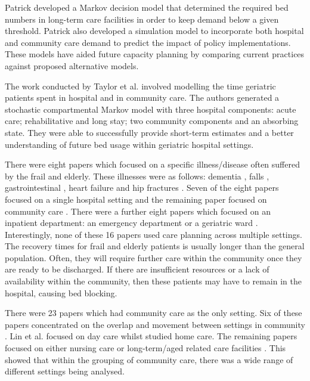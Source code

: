 \documentclass[../thesis.tex]{subfiles}
\begin{document}
Patrick \cite{Patrick} developed a Markov decision model that determined the required bed numbers in long-term care facilities in order to keep demand below a given threshold. Patrick also developed a simulation model to incorporate both hospital and community care demand to predict the impact of policy implementations. These models have aided future capacity planning by comparing current practices against proposed alternative models.

The work conducted by Taylor et al. \cite{Taylor} involved modelling the time geriatric patients spent in hospital and in community care. The authors generated a stochastic compartmental Markov model with three hospital components: acute care; rehabilitative and long stay; two community components and an absorbing state. They were able to successfully provide short-term estimates and a better understanding of future bed usage within geriatric hospital settings.

There were eight papers which focused on a specific illness/disease often suffered by the frail and elderly. These illnesses were as follows: dementia \cite{Cepoiu}, falls \cite{Franklin}, gastrointestinal \cite{Abe}, heart failure \cite{Azad, Kul, Shaw} and hip fractures \cite{Beaupre, Wallace}. Seven of the eight papers focused on a single hospital setting and the remaining paper focused on community care \cite{Cepoiu}. There were a further eight papers which focused on an inpatient department: an emergency department \cite{Patrick, Rashwan, Rossille,Trevisan} or a geriatric ward \cite{Christodoulou, Franck, Gorunescu,Marshall3}. Interestingly, none of these 16 papers used care planning across multiple settings. The recovery times for frail and elderly patients is usually longer than the general population. Often, they will require further care within the community once they are ready to be discharged. If there are insufficient resources or a lack of availability within the community, then these patients may have to remain in the hospital, causing bed blocking.


There were 23 papers which had community care as the only setting. Six of these papers concentrated on the overlap and movement between settings in community \cite{Bae, Gassoumis, YLi,Bidhandi,Welberry, Zhang1}. Lin et al. \cite{Lin} focused on day care whilst \cite{Eveborn, Grenouilleau, Guo, Yalcindag} studied home care. The remaining papers focused on either nursing care \cite{Arling,Borowiak, Muramatsu} or long-term/aged related care facilities \cite{Ambagtsheer, Arvelo, Cepoiu, Desai, Eggink, Katsaliaki, Kerpershoek, Tao, Xie}. This showed that within the grouping of community care, there was a wide range of different settings being analysed.
\end{document}
